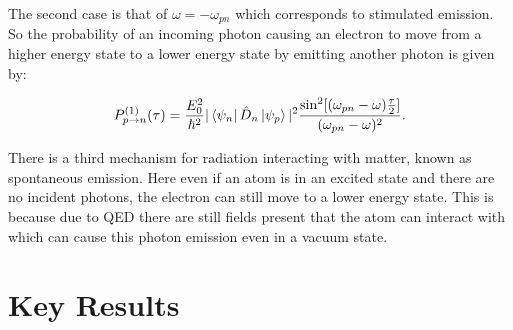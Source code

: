 \noindent The second case is that of $\omega = -\omega_{pn}$ which corresponds to stimulated emission. So the probability of an incoming photon causing an electron to move from a higher energy state to a lower energy state by emitting another photon is given by:

\begin{equation}
    P^{(1)}_{p\rightarrow n}(\tau) = \frac{E_0^2}{\hbar^2} |\bra{\psi_n} \Hat{D}_n \ket{\psi_p}|^2 \frac{\sin^2[(\omega_{pn} - \omega)\frac{\tau}{2}]}{(\omega_{pn} - \omega)^2}.
    \label{StimulatedEmission}
\end{equation}

\noindent There is a third mechanism for radiation interacting with matter, known as spontaneous emission. Here even if an atom is in an excited state and there are no incident photons, the electron can still move to a lower energy state. This is because due to QED there are still fields present that the atom can interact with which can cause this photon emission even in a vacuum state.

\section{Key Results}
